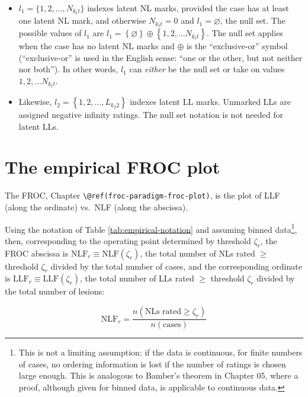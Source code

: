 \documentclass[
]{book}
\begin{document}
\begin{itemize}
\item
  \(l_1 = \{1, 2, ..., N_{k_t t}\}\) indexes latent NL marks, provided the case has at least one latent NL mark, and otherwise \(N_{k_t t} = 0\) and \(l_1 = \varnothing\), the null set. The possible values of \(l_1\) are \(l_1 = \left \{ \varnothing \right \}\oplus \left \{ 1,2,...N_{k_t t} \right \}\). The null set applies when the case has no latent NL marks and \(\oplus\) is the ``exclusive-or'' symbol (``exclusive-or'' is used in the English sense: ``one or the other, but not neither nor both''). In other words, \(l_1\) can \emph{either} be the null set or take on values \(1,2,...N_{k_t t}\).
\item
  Likewise, \(l_2 = \left \{ 1,2,...,L_{k_2 2} \right \}\) indexes latent LL marks. Unmarked LLs are assigned negative infinity ratings. The null set notation is not needed for latent LLs.
\end{itemize}

\hypertarget{empirical-froc-plot}{%
\section{The empirical FROC plot}\label{empirical-froc-plot}}

The FROC, Chapter \texttt{\textbackslash{}@ref(froc-paradigm-froc-plot)}, is the plot of LLF (along the ordinate) vs.~NLF (along the abscissa).

Using the notation of Table \ref{tab:empirical-notation} and assuming binned data\footnote{This is not a limiting assumption: if the data is continuous, for finite numbers of cases, no ordering information is lost if the number of ratings is chosen large enough. This is analogous to Bamber's theorem in Chapter 05, where a proof, although given for binned data, is applicable to continuous data.}, then, corresponding to the operating point determined by threshold \(\zeta_r\), the FROC abscissa is \(\text{NLF}_r \equiv \text{NLF}\left ( \zeta_r \right )\), the total number of NLs rated \(\geq\) threshold \(\zeta_r\) divided by the total number of cases, and the corresponding ordinate is \(\text{LLF}_r \equiv \text{LLF}\left ( \zeta_r \right )\), the total number of LLs rated \(\geq\) threshold \(\zeta_r\) divided by the total number of lesions:

\begin{equation}
\text{NLF}_r  = \frac{n\left ( \text{NLs rated} \geq \zeta_r\right )}{n\left ( \text{cases} \right )}
\label{eq:empirical-NLF1}
\end{equation}
\end{document}
